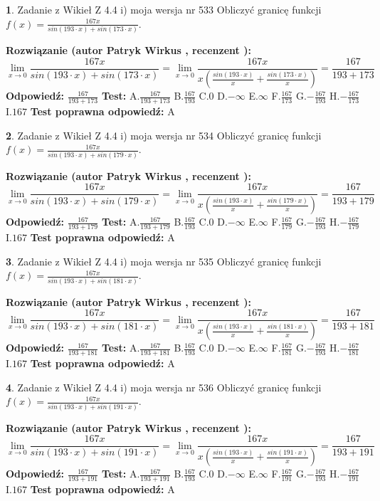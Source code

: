 \documentclass[12pt, a4paper]{article}
\theoremstyle{definition} %
\newtheorem{zad}{}
\newcommand{\zadStart}[1]{\begin{zad}#1\newline}
\newcommand{\zadStop}{\end{zad}}
\newcommand{\rozwStart}[2]{\noindent \textbf{Rozwiązanie (autor #1 , recenzent #2): }\newline}
\newcommand{\rozwStop}{\newline}
\newcommand{\odpStart}{\noindent \textbf{Odpowiedź:}\newline}
\newcommand{\odpStop}{\newline}
\newcommand{\testStart}{\noindent \textbf{Test:}\newline}
\newcommand{\testStop}{\newline}
\newcommand{\kluczStart}{\noindent \textbf{Test poprawna odpowiedź:}\newline}
\newcommand{\kluczStop}{\newline}
\begin{document}
\zadStart{Zadanie z Wikieł Z 4.4 i) moja wersja nr 533}
Obliczyć granicę funkcji $f(x)=\frac{167x}{sin(193\cdot x) +sin(173\cdot x)}$.
\zadStop
\rozwStart{Patryk Wirkus}{}
$$\lim\limits_{x\to 0}\frac{167x}{sin(193\cdot x) +sin(173\cdot x)}=\lim\limits_{x\to 0}\frac{167x}{x(\frac{sin(193\cdot x)}{x}+\frac{sin(173\cdot x)}{x})}=\frac{167}{193+173}$$
\rozwStop
\odpStart
$\frac{167}{193+173}$
\odpStop
\testStart
A.$\frac{167}{193+173}$
B.$\frac{167}{193}$
C.$0$
D.$-\infty$
E.$\infty$
F.$\frac{167}{173}$
G.$-\frac{167}{193}$
H.$-\frac{167}{173}$
I.$167$
\testStop
\kluczStart
A
\kluczStop



\zadStart{Zadanie z Wikieł Z 4.4 i) moja wersja nr 534}
Obliczyć granicę funkcji $f(x)=\frac{167x}{sin(193\cdot x) +sin(179\cdot x)}$.
\zadStop
\rozwStart{Patryk Wirkus}{}
$$\lim\limits_{x\to 0}\frac{167x}{sin(193\cdot x) +sin(179\cdot x)}=\lim\limits_{x\to 0}\frac{167x}{x(\frac{sin(193\cdot x)}{x}+\frac{sin(179\cdot x)}{x})}=\frac{167}{193+179}$$
\rozwStop
\odpStart
$\frac{167}{193+179}$
\odpStop
\testStart
A.$\frac{167}{193+179}$
B.$\frac{167}{193}$
C.$0$
D.$-\infty$
E.$\infty$
F.$\frac{167}{179}$
G.$-\frac{167}{193}$
H.$-\frac{167}{179}$
I.$167$
\testStop
\kluczStart
A
\kluczStop



\zadStart{Zadanie z Wikieł Z 4.4 i) moja wersja nr 535}
Obliczyć granicę funkcji $f(x)=\frac{167x}{sin(193\cdot x) +sin(181\cdot x)}$.
\zadStop
\rozwStart{Patryk Wirkus}{}
$$\lim\limits_{x\to 0}\frac{167x}{sin(193\cdot x) +sin(181\cdot x)}=\lim\limits_{x\to 0}\frac{167x}{x(\frac{sin(193\cdot x)}{x}+\frac{sin(181\cdot x)}{x})}=\frac{167}{193+181}$$
\rozwStop
\odpStart
$\frac{167}{193+181}$
\odpStop
\testStart
A.$\frac{167}{193+181}$
B.$\frac{167}{193}$
C.$0$
D.$-\infty$
E.$\infty$
F.$\frac{167}{181}$
G.$-\frac{167}{193}$
H.$-\frac{167}{181}$
I.$167$
\testStop
\kluczStart
A
\kluczStop



\zadStart{Zadanie z Wikieł Z 4.4 i) moja wersja nr 536}
Obliczyć granicę funkcji $f(x)=\frac{167x}{sin(193\cdot x) +sin(191\cdot x)}$.
\zadStop
\rozwStart{Patryk Wirkus}{}
$$\lim\limits_{x\to 0}\frac{167x}{sin(193\cdot x) +sin(191\cdot x)}=\lim\limits_{x\to 0}\frac{167x}{x(\frac{sin(193\cdot x)}{x}+\frac{sin(191\cdot x)}{x})}=\frac{167}{193+191}$$
\rozwStop
\odpStart
$\frac{167}{193+191}$
\odpStop
\testStart
A.$\frac{167}{193+191}$
B.$\frac{167}{193}$
C.$0$
D.$-\infty$
E.$\infty$
F.$\frac{167}{191}$
G.$-\frac{167}{193}$
H.$-\frac{167}{191}$
I.$167$
\testStop
\kluczStart
A
\kluczStop
\end{document}
